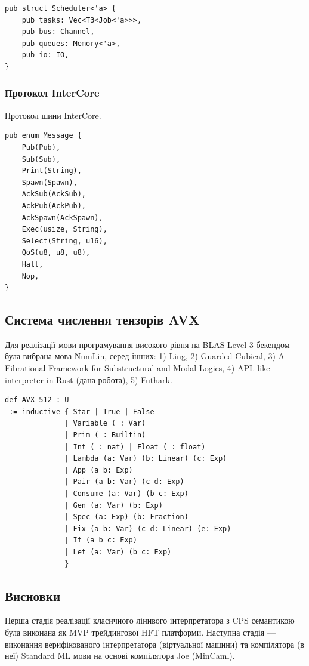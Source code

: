 \documentclass{article}
\begin{document}
\begin{lstlisting}
pub struct Scheduler<'a> {
    pub tasks: Vec<T3<Job<'a>>>,
    pub bus: Channel,
    pub queues: Memory<'a>,
    pub io: IO,
}
\end{lstlisting}

\newpage
\subsubsection{Протокол InterCore}
Протокол шини InterCore.

\begin{lstlisting}
pub enum Message {
    Pub(Pub),
    Sub(Sub),
    Print(String),
    Spawn(Spawn),
    AckSub(AckSub),
    AckPub(AckPub),
    AckSpawn(AckSpawn),
    Exec(usize, String),
    Select(String, u16),
    QoS(u8, u8, u8),
    Halt,
    Nop,
}
\end{lstlisting}

\subsection{Система числення тензорів AVX}
Для реалізації мови програмування високого рівня на BLAS Level 3 бекендом
була вибрана мова NumLin, серед інших: 1) Ling, 2) Guarded Cubical,
3) A Fibrational Framework for Substructural and Modal Logics,
4) APL-like interpreter in Rust (дана робота), 5) Futhark.

\begin{lstlisting}
def AVX-512 : U
 := inductive { Star | True | False
              | Variable (_: Var)
              | Prim (_: Builtin)
              | Int (_: nat) | Float (_: float)
              | Lambda (a: Var) (b: Linear) (c: Exp)
              | App (a b: Exp)
              | Pair (a b: Var) (c d: Exp)
              | Consume (a: Var) (b c: Exp)
              | Gen (a: Var) (b: Exp)
              | Spec (a: Exp) (b: Fraction)
              | Fix (a b: Var) (c d: Linear) (e: Exp)
              | If (a b c: Exp)
              | Let (a: Var) (b c: Exp)
              }
\end{lstlisting}

\subsection{Висновки}
Перша стадія реалізації класичного лінивого інтерпретатора з CPS семантикою
була виконана як MVP трейдингової HFT платформи. Наступна стадія — виконання
верифікованого інтерпретатора (віртуальної машини) та компілятора (в неї) Standard ML мови на
основі компілятора Joe (MinCaml).
\end{document}
